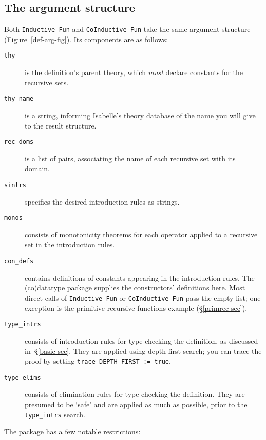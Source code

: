 \subsection{The argument structure}
Both \verb|Inductive_Fun| and \verb|CoInductive_Fun| take the same argument
structure (Figure~\ref{def-arg-fig}).  Its components are as follows:
\begin{description}
\item[\tt thy] is the definition's parent theory, which {\it must\/}
declare constants for the recursive sets.

\item[\tt thy\_name] is a string, informing Isabelle's theory database of
  the name you will give to the result structure.

\item[\tt rec\_doms] is a list of pairs, associating the name of each recursive
set with its domain.

\item[\tt sintrs] specifies the desired introduction rules as strings.

\item[\tt monos] consists of monotonicity theorems for each operator applied
to a recursive set in the introduction rules.

\item[\tt con\_defs] contains definitions of constants appearing in the
introduction rules.  The (co)datatype package supplies the constructors'
definitions here.  Most direct calls of \verb|Inductive_Fun| or
\verb|CoInductive_Fun| pass the empty list; one exception is the primitive
recursive functions example (\S\ref{primrec-sec}).

\item[\tt type\_intrs] consists of introduction rules for type-checking the
  definition, as discussed in~\S\ref{basic-sec}.  They are applied using
  depth-first search; you can trace the proof by setting
  \verb|trace_DEPTH_FIRST := true|.

\item[\tt type\_elims] consists of elimination rules for type-checking the
definition.  They are presumed to be `safe' and are applied as much as
possible, prior to the {\tt type\_intrs} search.
\end{description}
The package has a few notable restrictions:
